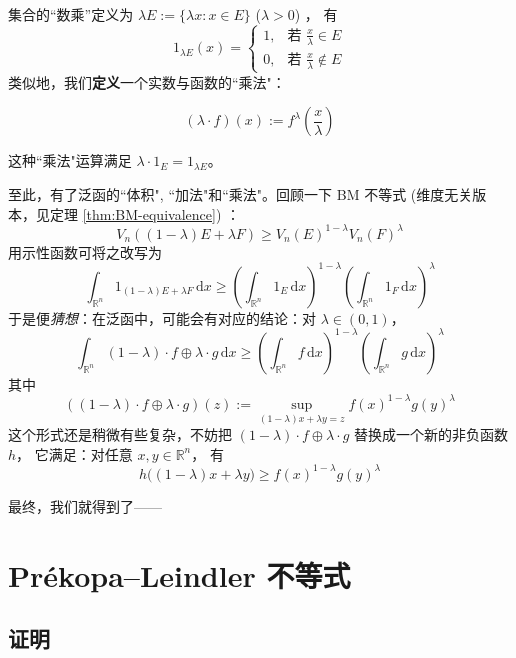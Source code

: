 集合的“数乘”定义为 $\lambda E:=\{\lambda x:x\in E\}$ ($\lambda > 0$) ， 有
\[
1_{\lambda E}(x)=
\begin{cases}
1, & \text{若 } \frac{x}{\lambda}\in E\\
0, & \text{若 } \frac{x}{\lambda}\notin E
\end{cases}
\]
类似地，我们\textbf{定义}一个实数与函数的``乘法"：
\begin{definition}
\[
(\lambda \cdot f)(x):=f^\lambda\left(\frac{x}{\lambda}\right)
\]    
\end{definition}
这种``乘法"运算满足 $\lambda \cdot 1_E=1_{\lambda E}$。

至此，有了泛函的``体积", ``加法"和``乘法"。回顾一下 BM 不等式 (维度无关版本，见定理 \ref{thm:BM-equivalence}) ：
\[
V_n((1-\lambda) E+\lambda F)\ge V_n(E)^{1-\lambda}V_n(F)^\lambda
\]
用示性函数可将之改写为
\[
\int_{\mathbb{R}^n}1_{(1-\lambda)E+\lambda F}\,\mathrm{d}x\ge \left(\int_{\mathbb{R}^n}1_{E}\,\mathrm{d}x\right)^{1-\lambda}\left(\int_{\mathbb{R}^n}1_{F}\,\mathrm{d}x\right)^{\lambda}
\]
于是便\emph{猜想}：在泛函中，可能会有对应的结论：对 $\lambda\in(0,1)$，
\[
\int_{\mathbb{R}^n}(1-\lambda)\cdot f\oplus \lambda \cdot g\,\mathrm{d}x\ge \left(\int_{\mathbb{R}^n}f\,\mathrm{d}x\right)^{1-\lambda}\left(\int_{\mathbb{R}^n}g\,\mathrm{d}x\right)^\lambda
\]
其中
\[
((1-\lambda) \cdot f \oplus \lambda \cdot g)(z):=\sup_{(1-\lambda)x+\lambda y=z}f(x)^{1-\lambda}g(y)^{\lambda}
\]
这个形式还是稍微有些复杂，不妨把 $(1-\lambda) \cdot f \oplus \lambda \cdot g$ 替换成一个新的非负函数 $h$， 它满足：对任意 $x,y\in\mathbb{R}^n$， 有
\[
h\big((1-\lambda)x+\lambda y\big)\ge f(x)^{1-\lambda}g(y)^\lambda
\]

最终，我们就得到了——

\section{Prékopa–Leindler 不等式}

\subsection{证明}

